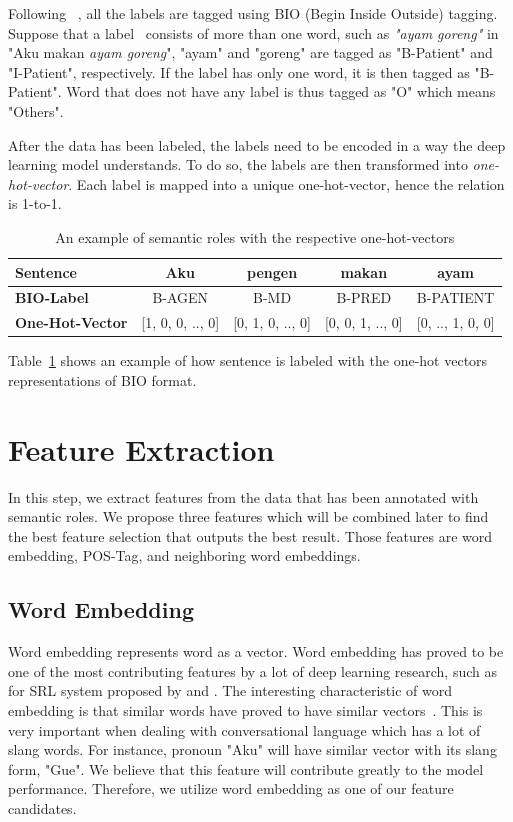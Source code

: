 Following ~\cite{collobert2011natural}, all the labels are tagged using BIO (Begin Inside Outside) tagging. Suppose that a label \patient~consists of more than one word, such as \textit{"ayam goreng"} in "Aku makan \textit{ayam goreng}", "ayam" and "goreng" are tagged as "B-Patient" and "I-Patient", respectively. If the label has only one word, it is then tagged as "B-Patient". Word that does not have any label is thus tagged as "O" which means "Others".

After the data has been labeled, the labels need to be encoded in a way the deep learning model understands. To do so, the labels are then transformed into \textit{one-hot-vector}. Each label is mapped into a unique one-hot-vector, hence the relation is 1-to-1.
\begin{table}
	\centering
	\caption{An example of semantic roles with the respective one-hot-vectors}
	\label{tab:examplelabel}
	\begin{tabular}{|lcccc|}
		\hline
		\textbf{Sentence} 				& Aku & pengen & makan & ayam \\
		\hline
		\textbf{BIO-Label}				& B-AGEN & B-MD & B-PRED & B-PATIENT  \\
		\hline
		\textbf{One-Hot-Vector}		& [1, 0, 0, .., 0] & [0, 1, 0, .., 0] & [0, 0, 1, .., 0] & [0, .., 1, 0, 0] \\
		\hline
	\end{tabular}
\end{table}

Table~\ref{tab:examplelabel} shows an example of how sentence is labeled with the one-hot vectors representations of BIO format.

\section{Feature Extraction}
In this step, we extract features from the data that has been annotated with semantic roles. We propose three features which will be combined later to find the best feature selection that outputs the best result. Those features are word embedding, POS-Tag, and neighboring word embeddings.

\subsection{Word Embedding}
Word embedding represents word as a vector. Word embedding has proved to be one of the most contributing features by a lot of deep learning research, such as for SRL system proposed by \cite{zhou2015end} and \cite{collobert2011natural}. The interesting characteristic of word embedding is that similar words have proved to have similar vectors~\citep{mikolov2013efficient}. This is very important when dealing with conversational language which has a lot of slang words. For instance, pronoun "Aku" will have similar vector with its slang form, "Gue". We believe that this feature will contribute greatly to the model performance. Therefore, we utilize word embedding as one of our feature candidates.

